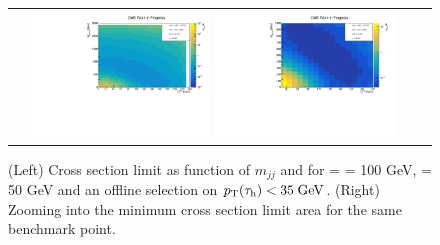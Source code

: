 \begin{figure}[tbh!]
	\centering
	\begin{tabular}{cc}
		\includegraphics[width=0.45\textwidth]{analysis/pics/JetInvMass_vs_MET_xsec_chi100_lsp050_taupt35.pdf}
		\includegraphics[width=0.45\textwidth]{analysis/pics/JetInvMass_vs_MET_xsec_chi100_lsp050_taupt35_zoom.pdf} 		
	\end{tabular}
	\caption{(Left) Cross section limit as function of $m_{jj}$ and \met for \charginopm = \neutralinotwo = 100 GeV, \neutralinoone = 50 GeV and an offline selection on $p_{\text{T}}(\tau_{\text{h}}) <  35\;\text{Ge}\kern-0.06667em\text{V}$. (Right) Zooming into the minimum cross section limit area for the same benchmark point.}
	\label{fig::JetInvMass_vs_MET_xsec_chi100_lsp050_taupt35}
\end{figure}

